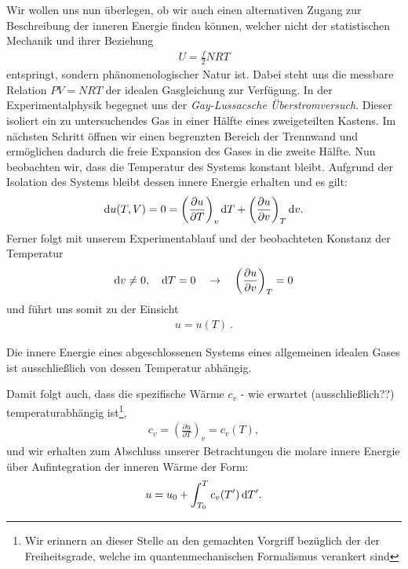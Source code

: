 Wir wollen uns nun überlegen, ob wir auch einen alternativen Zugang zur Beschreibung der inneren Energie finden können, welcher nicht der statistischen Mechanik und ihrer Beziehung 
\begin{align*}
    U=\frac{f}{2}NRT
\end{align*}
entspringt, sondern phänomenologischer Natur ist. 
Dabei steht uns die messbare Relation $PV=NRT$ der idealen Gasgleichung zur Verfügung.
In der Experimentalphysik begegnet uns der \emph{Gay-Lussacsche Überstromversuch}. Dieser isoliert ein zu untersuchendes Gas in einer Hälfte eines zweigeteilten Kastens. Im nächsten Schritt öffnen wir einen begrenzten Bereich der Trennwand und ermöglichen dadurch die freie Expansion des Gases in die zweite Hälfte. Nun beobachten wir, dass die Temperatur des Systems konstant bleibt. 
Aufgrund der Isolation des Systems bleibt dessen innere Energie erhalten und es gilt: 
\begin{align*}
    \mathop{}\!\mathrm{d} u(T,V)=0=\left(\frac{\partial u}{\partial T}\right)_v\mathop{}\!\mathrm{d} T+\left(\frac{\partial u}{\partial v}\right)_T\mathop{}\!\mathrm{d} v.
\end{align*}
Ferner folgt mit unserem Experimentablauf und der beobachteten Konstanz der Temperatur 
\begin{align*}
    \mathop{}\!\mathrm{d} v \neq 0,\quad\mathop{}\!\mathrm{d} T=0\quad\rightarrow\quad \left(\frac{\partial u}{\partial v}\right)_T=0
\end{align*}
und führt uns somit zu der Einsicht 
\begin{align*}
    \boxed{u=u(T)}\:.
\end{align*}
\begin{formal}
    Die innere Energie eines abgeschlossenen Systems eines allgemeinen idealen Gases ist ausschließlich von dessen Temperatur abhängig.   
\end{formal}
Damit folgt auch, dass die spezifische Wärme $c_v$ - wie erwartet \textendash{} (ausschließlich??) temperaturabhängig ist\footnote{Wir erinnern an dieser Stelle an den gemachten Vorgriff bezüglich der  der Freiheitsgrade, welche im quantenmechanischen Formalismus verankert sind},
\begin{align*}
    c_v=\left(\frac{\partial u}{\partial T}\right)_v=c_v(T),
\end{align*}
und wir erhalten zum Abschluss unserer Betrachtungen die molare innere Energie über Aufintegration der inneren Wärme der Form: 
\begin{align*}
    u=u_0+\int_{T_0}^Tc_v(T')\mathop{}\!\mathrm{d} T'.
\end{align*}
